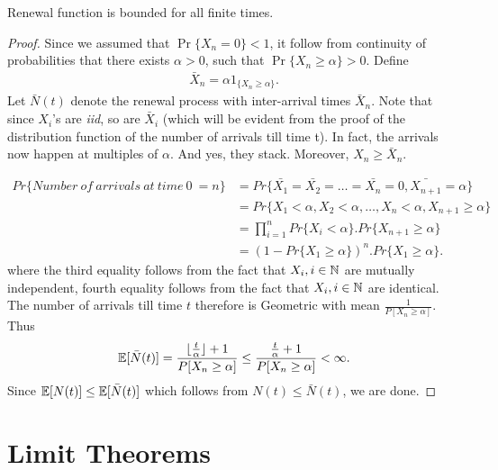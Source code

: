 \documentclass[a4paper,10pt, english]{article}
\begin{document}
\begin{prop} Renewal function is bounded for all finite times.
\end{prop}
\begin{proof}
	Since we assumed that $\Pr\{X_n = 0\} < 1$, it follow from continuity of probabilities that there exists $\alpha > 0$, such that $\Pr\{X_n \geq \alpha\} >0$. Define
	\begin{align*}
	\bar{X}_n = \alpha 1_{\{X_n \geq \alpha\}}.
	\end{align*}
	Let $\bar{N}(t)$ denote the renewal process with inter-arrival times $\bar{X}_n$. Note that since $X_i$'s are \emph{iid}, so are $\bar{X}_i$ (which will be evident from the proof of the distribution function of the number of arrivals till time t). In fact, the arrivals now happen at multiples of $\alpha$. And yes, they stack. Moreover, $X_n \geq \bar{X}_n$.
	
	\begin{align*}
	Pr\{Number ~of ~arrivals ~at ~time ~0 ~= n\} &= Pr\{\bar{X_1}=\bar{X_2}=\ldots=\bar{X_n}=0,\bar{X_{n+1}}=\alpha\} \\
	&= Pr\{X_1 < \alpha,X_2 < \alpha,\ldots,X_n < \alpha,X_{n+1} \geq \alpha\} \\
	&= \prod_{i=1}^{n} Pr\{X_i < \alpha\} . Pr\{X_{n+1} \geq \alpha \}  \\
	&= \left(1- Pr\{X_1 \geq \alpha \}\right) ^{n} . Pr\{X_1 \geq \alpha\}.
	\end{align*}
	where the third equality follows from the fact that $ X_i, i \in \mathbb{N}$ are mutually independent, fourth equality follows from the fact that $ X_i, i \in \mathbb{N}$ are identical.
	\\
	The number of arrivals till time $t$ therefore is Geometric with mean $\frac{1}{P[X_n \geq \alpha]}$. Thus 
	\begin{align*}
	\mathbb{E}[\bar{N}(t)] = \frac{\lfloor\frac{t}{\alpha} \rfloor + 1}{P[X_n \geq \alpha]} \leq \frac{\frac{t}{\alpha} + 1}{P[X_n \geq \alpha]} < \infty.
	\end{align*}
	Since $\mathbb{E}[N(t)] \leq \mathbb{E}[\bar{N}(t)]$ which follows from $N(t) \leq \bar{N}(t)$, we are done.
\end{proof} 

\section{Limit Theorems}
\end{document}
